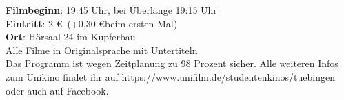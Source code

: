 \textbf{Filmbeginn}: 19:45 Uhr, bei Überlänge 19:15 Uhr\\
\textbf{Eintritt}: 2 \euro ~(+0,30 \euro beim ersten Mal)\\
\textbf{Ort}: Hörsaal 24 im Kupferbau\\
Alle Filme in Originalsprache mit Untertiteln\\

Das Programm ist wegen Zeitplanung zu 98 Prozent sicher.
Alle weiteren Infos zum Unikino findet ihr auf \url{https://www.unifilm.de/studentenkinos/tuebingen} oder auch auf Facebook.	%